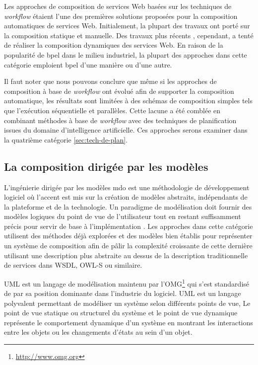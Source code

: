   Les approches de composition de services Web basées sur les
  techniques de \textit{workflow} étaient l'une des premières solutions
  proposées pour la composition automatiques de services
  Web. Initialement, la plupart des travaux ont porté sur la
  composition statique et manuelle. Des travaux plus récents
  \cite{majithia2004framework, ardagna2007paws, fujii2006semantics,
    fujii2009semantics}, cependant, a tenté de réaliser la composition
  dynamiques des services Web. En raison de la popularité de
  \acrshort{bpel} dans le milieu industriel, la plupart des approches
  dans cette catégorie emploient \acrshort{bpel} d'une manière ou d'une
  autre.\medskip

  Il faut noter que nous pouvons conclure que même si les approches
  de composition à base de \textit{workflow} ont évolué afin de
  supporter la composition automatique, les résultats sont limitées à
  des schémas de composition simples tels que l'exécution séquentielle
  et parallèles. Cette lacune a été comblée en combinant méthodes à
  base de \textit{workflow} avec des techniques de planification
  issues du domaine d'intelligence artificielle. Ces approches serons
  examiner dans la quatrième catégorie \ref{sec:tech-de-plan}.

  \subsection{La composition dirigée par les modèles}
  \label{sec:model-based-composition}
  L'ingénierie dirigée par les modèles \acrshort{mdo} est une
  méthodologie de développement logiciel où l'accent est mis sur la
  création de modèles abstraits, indépendants de la plateforme et de
  la technologie. Un paradigme de modélisation doit fournir des
  modèles logiques du point de vue de l'utilisateur tout en restant
  suffisamment précis pour servir de base à l'implémentation
  \cite{dumez2010approche}. Les approches dans cette catégorie
  utilisent des méthodes déjà explorées et des modèles bien établis
  pour représenter un système de composition afin de pâlir la
  complexité croissante de cette dernière utilisant une description
  plus abstraite au dessus de la description traditionnelle de
  services dans \textsc{WSDL}, \textsc{OWL-S} ou similaire.\medskip

  \textsc{UML} \cite{rumbaugh2004unified} est un langage de
  modélisation maintenu par
  l'\textsc{OMG}\footnote{\url{http://www.omg.org}} qui s'est
  standardisé de par sa position dominante dans l'industrie du
  logiciel. \textsc{UML} est un langage polyvalent permettant de
  modéliser un système selon différents points de vue, Le point de vue
  statique ou structurel du système et le point de vue dynamique
  représente le comportement dynamique d'un système en montrant les
  interactions entre les objets ou les changements d'états au sein
  d'un objet.\medskip

